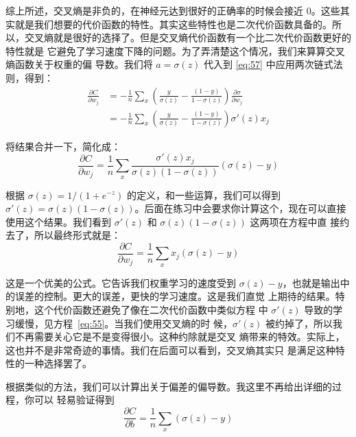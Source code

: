 综上所述，交叉熵是非负的，在神经元达到很好的正确率的时候会接近
$0$。这些其实就是我们想要的代价函数的特性。其实这些特性也是二次代价函数具备的。所
以，交叉熵就是很好的选择了。但是交叉熵代价函数有一个比二次代价函数更好的特性就是
它避免了学习速度下降的问题。为了弄清楚这个情况，我们来算算交叉熵函数关于权重的偏
导数。我们将 $a=\sigma(z)$ 代入到 \eqref{eq:57} 中应用两次链式法则，得到：
\begin{align}
  \frac{\partial C}{\partial w_j} &= -\frac{1}{n} \sum_x \left(
                                    \frac{y }{\sigma(z)} -\frac{(1-y)}{1-\sigma(z)} \right)
                                    \frac{\partial \sigma}{\partial w_j} \label{eq:58}\tag{58}\\
                                  &= -\frac{1}{n} \sum_x \left(
                                    \frac{y}{\sigma(z)}
                                    -\frac{(1-y)}{1-\sigma(z)} \right)\sigma'(z) x_j \label{eq:59}\tag{59}
\end{align}

将结果合并一下，简化成：
\begin{equation}
  \frac{\partial C}{\partial w_j} = \frac{1}{n}
  \sum_x \frac{\sigma'(z) x_j}{\sigma(z) (1-\sigma(z))}
  (\sigma(z)-y)
\label{eq:60}\tag{60}
\end{equation}

根据 $\sigma(z) = 1/(1+e^{-z})$ 的定义，和一些运算，我们可以得到
$\sigma'(z) = \sigma(z)(1-\sigma(z))$。后面在练习中会要求你计算这个，现在可以直接
使用这个结果。我们看到 $\sigma'(z)$ 和 $\sigma(z)(1-\sigma(z))$ 这两项在方程中直
接约去了，所以最终形式就是：
\begin{equation}
  \frac{\partial C}{\partial w_j} =  \frac{1}{n} \sum_x x_j(\sigma(z)-y)
\label{eq:61}\tag{61}
\end{equation}

这是一个优美的公式。它告诉我们权重学习的速度受到
$\sigma(z)-y$，也就是输出中的误差的控制。更大的误差，更快的学习速度。这是我们直觉
上期待的结果。特别地，这个代价函数还避免了像在二次代价函数中类似方程
中 $\sigma'(z)$ 导致的学习缓慢，见方程~\eqref{eq:55}。当我们使用交叉熵的时
候，$\sigma'(z)$ 被约掉了，所以我们不再需要关心它是不是变得很小。这种约除就是交叉
熵带来的特效。实际上，这也并不是非常奇迹的事情。我们在后面可以看到，交叉熵其实只
是满足这种特性的一种选择罢了。

根据类似的方法，我们可以计算出关于偏差的偏导数。我这里不再给出详细的过程，你可以
轻易验证得到
\begin{equation}
  \frac{\partial C}{\partial b} = \frac{1}{n} \sum_x (\sigma(z)-y)
\label{eq:62}\tag{62}
\end{equation}

